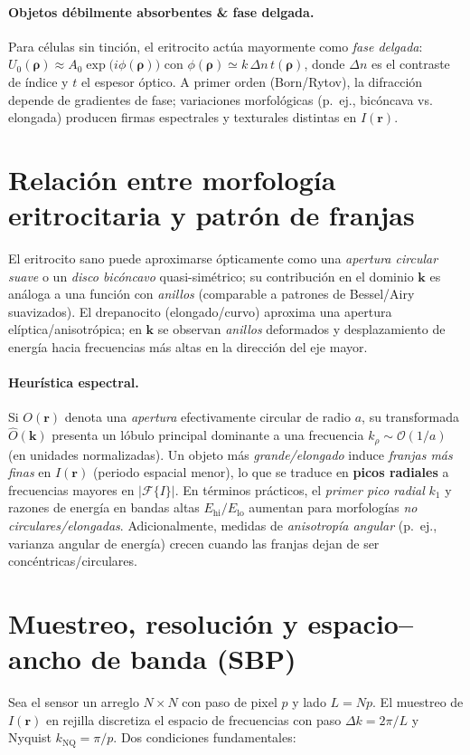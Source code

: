 \paragraph{Objetos débilmente absorbentes \& fase delgada.} Para células sin tinción, el eritrocito actúa mayormente como \emph{fase delgada}: $U_0(\boldsymbol{\rho}) \approx A_0 \exp\!\big(i\phi(\boldsymbol{\rho})\big)$ con $\phi(\boldsymbol{\rho})\simeq k\,\Delta n\,t(\boldsymbol{\rho})$, donde $\Delta n$ es el contraste de índice y $t$ el espesor óptico. A primer orden (Born/Rytov), la difracción depende de gradientes de fase; variaciones morfológicas (p.~ej., bicóncava vs. elongada) producen firmas espectrales y texturales distintas en $I(\mathbf{r})$.

\section{Relación entre morfología eritrocitaria y patrón de franjas}
El eritrocito sano puede aproximarse ópticamente como una \emph{apertura circular suave} o un \emph{disco bicóncavo} quasi-simétrico; su contribución en el dominio $\mathbf{k}$ es análoga a una función con \emph{anillos} (comparable a patrones de Bessel/Airy suavizados). El drepanocito (elongado/curvo) aproxima una apertura elíptica/aniso\-trópica; en $\mathbf{k}$ se observan \emph{anillos} deformados y desplazamiento de energía hacia frecuencias más altas en la dirección del eje mayor.

\paragraph{Heurística espectral.} Si $O(\mathbf{r})$ denota una \emph{apertura} efectivamente circular de radio $a$, su transformada $\widehat{O}(\mathbf{k})$ presenta un lóbulo principal dominante a una frecuencia $k_\rho \sim \mathcal{O}(1/a)$ (en unidades normalizadas). Un objeto más \emph{grande/elongado} induce \emph{franjas más finas} en $I(\mathbf{r})$ (periodo espacial menor), lo que se traduce en \textbf{picos radiales} a frecuencias mayores en $|\mathcal{F}\{I\}|$. En términos prácticos, el \emph{primer pico radial} $k_1$ y razones de energía en bandas altas $E_{\text{hi}}/E_{\text{lo}}$ aumentan para morfologías \emph{no circulares/elongadas}. Adicionalmente, medidas de \emph{anisotropía angular} (p.~ej., varianza angular de energía) crecen cuando las franjas dejan de ser concéntricas/circulares.

\section{Muestreo, resolución y espacio–ancho de banda (SBP)}
Sea el sensor un arreglo $N\times N$ con paso de pixel $p$ y lado $L=Np$. El muestreo de $I(\mathbf{r})$ en rejilla discretiza el espacio de frecuencias con paso $\Delta k=2\pi/L$ y Nyquist $k_\text{NQ}=\pi/p$. Dos condiciones fundamentales:

